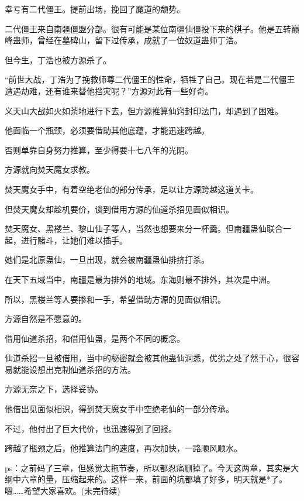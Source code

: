 \begin{this_body}
幸亏有二代僵王。提前出场，挽回了魔道的颓势。

二代僵王来自南疆僵盟分部。很有可能是某位南疆仙僵投下来的棋子。他是五转巅峰蛊师，曾经在墓碑山，留下过传承，成就了一位奴道蛊师丁浩。

但今生，丁浩也被方源杀了。

“前世大战，丁浩为了挽救师尊二代僵王的性命，牺牲了自己。现在若是二代僵王遭遇劫难，还有谁来替他挡灾呢？”方源对此有一些好奇。

义天山大战如火如荼地进行下去，但方源推算仙窍封印法门，却遇到了困难。

他面临一个瓶颈，必须要借助其他底蕴，才能迅速跨越。

否则单靠自身努力推算，至少得要十七八年的光阴。

方源就向焚天魔女求教。

焚天魔女手中，有着空绝老仙的部分传承，足以让方源跨越这道关卡。

但焚天魔女却趁机要价，谈到借用方源的仙道杀招见面似相识。

焚天魔女、黑楼兰、黎山仙子等人，当然也想要来分一杯羹。但南疆蛊仙联合一起，进行赌斗，让她们难以插手。

她们是北原蛊仙，一旦出现，就会被南疆蛊仙排挤打杀。

在天下五域当中，南疆是最为排外的地域。东海则最不排外，其次是中洲。

所以，黑楼兰等人要掺和一手，希望借助方源的见面似相识。

方源自然是不愿意的。

借用仙道杀招，和借用仙蛊，是两个不同的概念。

仙道杀招一旦被借用，当中的秘密就会被其他蛊仙洞悉，优劣之处了然于心，很容易就能设想出克制仙道杀招的方法。

方源无奈之下，选择妥协。

他借出见面似相识，得到焚天魔女手中空绝老仙的一部分传承。

不过，他付出了巨大代价，也迅速得到了回报。

跨越了瓶颈之后，他推算法门的速度，再次加快，一路顺风顺水。

ps：之前码了三章，但感觉太拖节奏，所以都忍痛删掉了。今天这两章，其实是大纲中六章的量，压缩起来的。这样一来，前面的坑都填了好多，明天就是*了。嗯……希望大家喜欢。(未完待续)

\end{this_body}

